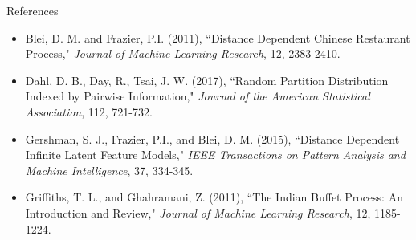 \documentclass[serif,mathserif,final]{beamer}
\begin{document}
\begin{frame}{}
\begin{columns}[t]
\begin{column}{0.56\linewidth}
    \end{column}%


  \end{columns}





      \begin{block}{References}
        \begin{itemize}
          \normalsize
          \item
            Blei, D. M. and Frazier, P.I. (2011),
            ``Distance Dependent Chinese Restaurant Process,"
            \emph{Journal of Machine Learning Research}, 12, 2383-2410.
          \item
            Dahl, D. B., Day, R., Tsai, J. W. (2017), ``Random Partition Distribution Indexed by Pairwise Information,"
              \emph{Journal of the American Statistical Association}, 112, 721-732.
          \item
            Gershman, S. J., Frazier, P.I., and Blei, D. M. (2015), ``Distance Dependent Infinite Latent Feature Models," \emph{IEEE Transactions on Pattern Analysis and Machine Intelligence}, 37, 334-345.
          \item
            Griffiths, T. L., and Ghahramani, Z. (2011), ``The Indian Buffet Process: An Introduction and Review," \emph{Journal of Machine Learning Research}, 12, 1185-1224.
        \end{itemize}
      \end{block}




\end{frame}
\end{document}
